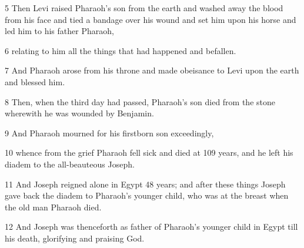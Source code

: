 \par 5 Then Levi raised Pharaoh's son from the earth and washed away the blood from his face and tied a bandage over his wound and set him upon his horse and led him to his father Pharaoh, 

\par 6 relating to him all the things that had happened and befallen. 

\par 7 And Pharaoh arose from his throne and made obeisance to Levi upon the earth and blessed him. 

\par 8 Then, when the third day had passed, Pharaoh's son died from the stone wherewith he was wounded by Benjamin. 

\par 9 And Pharaoh mourned for his firstborn son exceedingly, 

\par 10 whence from the grief Pharaoh fell sick and died at 109 years, and he left his diadem to the all-beauteous Joseph. 

\par 11 And Joseph reigned alone in Egypt 48 years; and after these things Joseph gave back the diadem to Pharaoh's younger child, who was at the breast when the old man Pharaoh died. 

\par 12 And Joseph was thenceforth as father of Pharaoh's younger child in Egypt till his death, glorifying and praising God.


